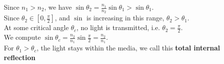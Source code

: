 \begin{theorem}
    
\end{theorem}

Since $n_1 > n_2$, we have $\sin \theta_2 = \frac{n_1}{n_2} \sin \theta_1 > \sin \theta_1$. \\
Since $\theta_2 \in [0, \frac{\pi}{2}]$, and $\sin$ is increasing in this range, $\theta_2 > \theta_1$. \\
At some critical angle $\theta_c$, no light is transmitted, i.e. $\theta_2 = \frac{\pi}{2}$. \\
We compute $\sin \theta_c = \frac{n_2}{n_1} \sin \frac{\pi}{2} = \frac{n_2}{n_1}$. \\
For $\theta_1 > \theta_c$, the light stays within the media, we call this \textbf{total internal reflection}
